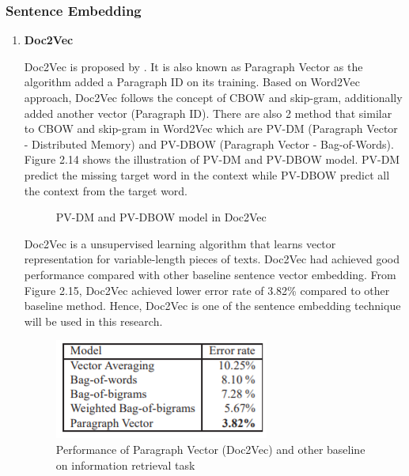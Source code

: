 \documentclass[twoside]{utmthesis}
\begin{document}
\subsubsection{Sentence Embedding}

\begin{enumerate}
	\item \textbf{Doc2Vec}
	
	Doc2Vec is proposed by \citep{le2014distributed}. It is also known as Paragraph Vector as the algorithm added a Paragraph ID on its training. Based on Word2Vec approach, Doc2Vec follows the concept of CBOW and skip-gram, additionally added another vector (Paragraph ID). There are also 2 method that similar to CBOW and skip-gram in Word2Vec which are PV-DM (Paragraph Vector - Distributed Memory) and PV-DBOW (Paragraph Vector - Bag-of-Words). Figure 2.14 shows the illustration of PV-DM and PV-DBOW model. PV-DM predict the missing target word in the context while PV-DBOW predict all the context from the target word. 
	
	\begin{figure}[H]
		\centering
		\caption{PV-DM and PV-DBOW model in Doc2Vec \citep{le2014distributed}}
		\label{fig:doc2vec}
	\end{figure}

	Doc2Vec is a unsupervised learning algorithm that learns vector representation for variable-length pieces of texts. Doc2Vec had achieved good performance compared with other baseline sentence vector embedding. From Figure 2.15, Doc2Vec achieved lower error rate of 3.82\% compared to other baseline method. Hence, Doc2Vec is one of the sentence embedding technique will be used in this research.                             
	
	\begin{figure}[H]
		\centering
		\includegraphics[width=0.8\linewidth]{diagram/doc2vec_performance}
		\caption{Performance of Paragraph Vector (Doc2Vec) and other baseline on information retrieval task \citep{le2014distributed}}
		\label{fig:doc2vecperformance}
	\end{figure}
	

\end{enumerate}
\end{document}
